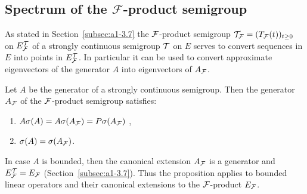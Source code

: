 \subsection{Spectrum of the 
\texorpdfstring{$\mathcal{F}$-product}{F-product} semigroup}\label{subsec:a3-4.5}
As stated in Section~\ref{subsec:a1-3.7} the $\mathcal{F}$-product semigroup $\TT_{\F} = (T_{\F}(t))_{t \geq 0}$ on $E_{\mathcal{F}}^{\mathcal{T}}$ of a strongly continuous semigroup $\mathcal{T}$ on $E$ serves to convert sequences in $E$ into points in $E_{\mathcal{F}}^{\mathcal{T}}$.
In particular it can be used to convert approximate eigenvectors of the generator $A$ into eigenvectors of\/ $A_{\mathcal{F}}$.
\begin{proposition}\label{prop:a3-4.4}
Let $A$ be the generator of a strongly continuous semigroup. Then the generator $A_{\mathcal{F}}$ of the $\mathcal{F}$-product semigroup satisfies:
\begin{enumerate}[\upshape (i)]
\item 
	$A\sigma(A) = A\sigma(A_{\mathcal{F}}) = P\sigma(A_{\mathcal{F}})$ ,

\item 
	$\sigma(A) = \sigma(A_{\mathcal{F}})$. 
\end{enumerate}
\end{proposition}
\begin{remark}
In case $A$ is bounded, then the canonical extension $A_{\mathcal{F}}$ is a generator and $E_{\mathcal{F}}^{\mathcal{T}} = E_{\mathcal{F}}$ (\cf Section~\ref{subsec:a1-3.7}).
Thus the proposition applies to bounded linear operators and their canonical extensions to the 
$\mathcal{F}$-product $E_{\mathcal{F}}$.
\end{remark}
